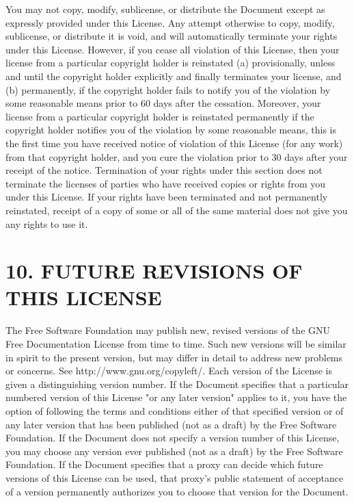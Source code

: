 You may not copy, modify, sublicense, or distribute the Document except as expressly provided under this License. Any attempt otherwise to copy, modify, sublicense, or distribute it is void, and will automatically terminate your rights under this License.
However, if you cease all violation of this License, then your license from a particular copyright holder is reinstated (a) provisionally, unless and until the copyright holder explicitly and finally terminates your license, and (b) permanently, if the copyright holder fails to notify you of the violation by some reasonable means prior to 60 days after the cessation.
Moreover, your license from a particular copyright holder is reinstated permanently if the copyright holder notifies you of the violation by some reasonable means, this is the first time you have received notice of violation of this License (for any work) from that copyright holder, and you cure the violation prior to 30 days after your receipt of the notice.
Termination of your rights under this section does not terminate the licenses of parties who have received copies or rights from you under this License. If your rights have been terminated and not permanently reinstated, receipt of a copy of some or all of the same material does not give you any rights to use it.

\section{10. FUTURE REVISIONS OF THIS LICENSE}


The Free Software Foundation may publish new, revised versions of the GNU Free Documentation License from time to time. Such new versions will be similar in spirit to the present version, but may differ in detail to address new problems or concerns. See http://www.gnu.org/copyleft/.
Each version of the License is given a distinguishing version number. If the Document specifies that a particular numbered version of this License "or any later version" applies to it, you have the option of following the terms and conditions either of that specified version or of any later version that has been published (not as a draft) by the Free Software Foundation. If the Document does not specify a version number of this License, you may choose any version ever published (not as a draft) by the Free Software Foundation. If the Document specifies that a proxy can decide which future versions of this License can be used, that proxy's public statement of acceptance of a version permanently authorizes you to choose that version for the Document.

